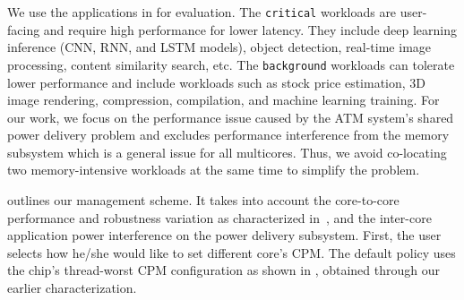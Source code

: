\begin{table}[h!]
  \centering

  \caption{Classifying critical and background applications, based on their memory subsystem interference behavior.} 
  \vspace{-0.2cm}

  \label{tab:bench-type} 
\end{table}

We use the applications in  for evaluation. The \texttt{critical} workloads are user-facing and require high performance for lower latency. They include deep learning inference (CNN, RNN, and LSTM models), object detection, real-time image processing, content similarity search, etc. The \texttt{background} workloads can tolerate lower performance and include workloads such as stock price estimation, 3D image rendering, compression, compilation, and machine learning training. For our work, we focus on the performance issue caused by the ATM system's shared power delivery problem and excludes performance interference from the memory subsystem which is a general issue for all multicores. Thus, we avoid co-locating two memory-intensive workloads at the same time to simplify the problem.

 outlines our management scheme. It takes into account the core-to-core performance and robustness variation as characterized in~, and the inter-core application power interference on the power delivery subsystem. First, the user selects how he/she would like to set different core's CPM. The default policy uses the chip's thread-worst CPM configuration as shown in , obtained through our earlier characterization.

